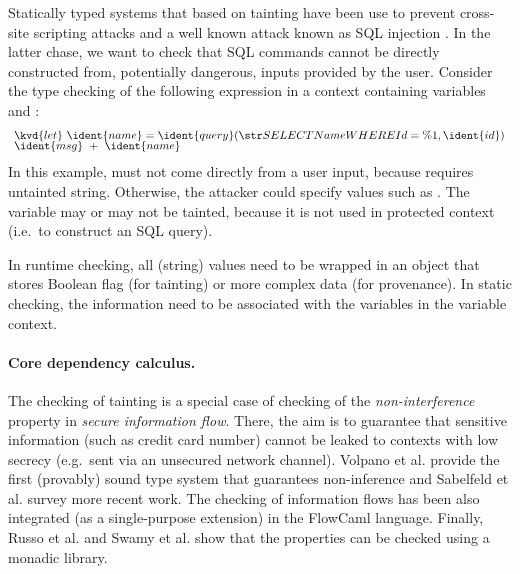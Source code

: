 Statically typed systems that based on tainting have been use to prevent cross-site scripting
attacks \cite{app-tainting-xss} and a well known attack known as SQL injection
\cite{app-tainting-sql,app-tainting-wasp}. In the latter chase, we want to check that SQL commands 
cannot be directly constructed from, potentially dangerous, inputs provided by the user. Consider the 
type checking of the following expression in a context containing variables  and :
%
\begin{equation*}
\begin{array}{l}
\kvd{let}~\ident{name} = \ident{query}(\str{SELECT Name WHERE Id = \%1}, \ident{id})\\[-0.25em]
\ident{msg}~+~\ident{name}
\end{array}
\end{equation*}
%
In this example,  must not come directly from a user input, because  requires 
untainted string. Otherwise, the attacker could specify values such as . 
The variable  may or may not be tainted, because it is not used in protected context 
(i.e.~to construct an SQL query). 

In runtime checking, all (string) values need to be wrapped in an object that stores Boolean 
flag (for tainting) or more complex data (for provenance). In static checking, the information
need to be associated with the variables in the variable context. 


\paragraph{Core dependency calculus.}
The checking of tainting is a special case of checking of the \emph{non-interference} property 
in \emph{secure information flow}. There, the aim is to guarantee that sensitive information (such
as credit card number) cannot be leaked to contexts with low secrecy (e.g.~sent via an unsecured
network channel). Volpano et al. \cite{app-secure-flow} provide the first (provably) sound type 
system that guarantees non-inference and Sabelfeld et al. \cite{app-secure-information-flow} survey
more recent work. The checking of information flows has been also integrated (as a single-purpose
extension) in the FlowCaml \cite{app-security-flowcaml} language. Finally, Russo et al. and 
Swamy et al. \cite{monad-secure-flow,monads-lightweight-ml} show that the properties can be checked
using a monadic library.


